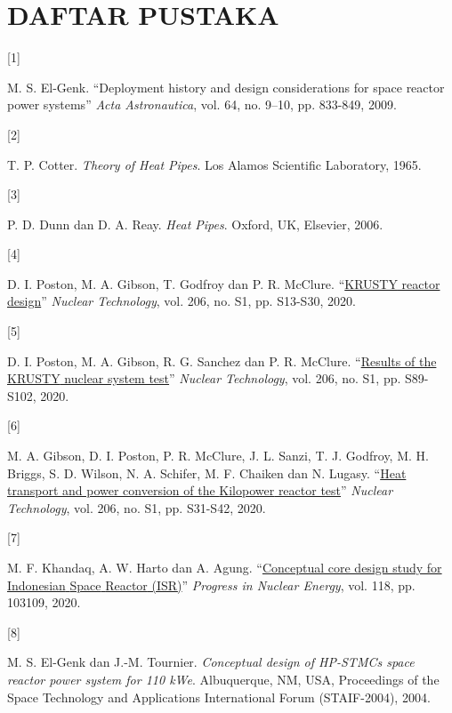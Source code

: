\documentclass[
  indonesian,
  12pt,
  a4paper,
]{report}
\newlength{\cslhangindent}
\newlength{\csllabelwidth}
\newenvironment{CSLReferences}[2] %
 {\begin{list}{}{%
  \setlength{\itemindent}{0pt}
  \setlength{\leftmargin}{0pt}
  \setlength{\parsep}{0pt}
  \ifodd #1
   \setlength{\leftmargin}{\cslhangindent}
   \setlength{\itemindent}{-1\cslhangindent}
  \fi
  \setlength{\itemsep}{#2\baselineskip}}}
 {\end{list}}
\newcommand{\CSLLeftMargin}[1]{\parbox[t]{\csllabelwidth}{\strut#1\strut}}
\newcommand{\CSLRightInline}[1]{\parbox[t]{\linewidth - \csllabelwidth}{\strut#1\strut}}
\begin{document}
\chapter*{DAFTAR PUSTAKA}

\protect{}\label{refs}
\begin{CSLReferences}{0}{1}
\CSLLeftMargin{{[}1{]} }%
\CSLRightInline{M. S. El-Genk. {``Deployment history and design
considerations for space reactor power systems''} \emph{Acta
Astronautica}, vol. 64, no. 9--10, pp. 833-849, 2009.}

\CSLLeftMargin{{[}2{]} }%
\CSLRightInline{T. P. Cotter. \emph{Theory of Heat Pipes}. Los Alamos
Scientific Laboratory, 1965.}

\CSLLeftMargin{{[}3{]} }%
\CSLRightInline{P. D. Dunn dan D. A. Reay. \emph{Heat Pipes}. Oxford,
UK, Elsevier, 2006.}

\CSLLeftMargin{{[}4{]} }%
\CSLRightInline{D. I. Poston, M. A. Gibson, T. Godfroy dan P. R.
McClure.
{``\href{https://doi.org/10.1080/00295450.2020.1725382}{{KRUSTY} reactor
design}''} \emph{Nuclear Technology}, vol. 206, no. S1, pp. S13-S30,
2020.}

\CSLLeftMargin{{[}5{]} }%
\CSLRightInline{D. I. Poston, M. A. Gibson, R. G. Sanchez dan P. R.
McClure. {``\href{https://doi.org/10.1080/00295450.2020.1730673}{Results
of the {KRUSTY} nuclear system test}''} \emph{Nuclear Technology}, vol.
206, no. S1, pp. S89-S102, 2020.}

\CSLLeftMargin{{[}6{]} }%
\CSLRightInline{M. A. Gibson, D. I. Poston, P. R. McClure, J. L. Sanzi,
T. J. Godfroy, M. H. Briggs, S. D. Wilson, N. A. Schifer, M. F. Chaiken
dan N. Lugasy.
{``\href{https://doi.org/10.1080/00295450.2019.1709364}{Heat transport
and power conversion of the {Kilopower} reactor test}''} \emph{Nuclear
Technology}, vol. 206, no. S1, pp. S31-S42, 2020.}

\CSLLeftMargin{{[}7{]} }%
\CSLRightInline{M. F. Khandaq, A. W. Harto dan A. Agung.
{``\href{https://doi.org/10.1016/j.pnucene.2019.103109}{Conceptual core
design study for {Indonesian} {Space} {Reactor} ({ISR})}''}
\emph{Progress in Nuclear Energy}, vol. 118, pp. 103109, 2020.}

\CSLLeftMargin{{[}8{]} }%
\CSLRightInline{M. S. El-Genk dan J.-M. Tournier. \emph{Conceptual
design of {HP-STMCs} space reactor power system for 110 {kWe}}.
Albuquerque, NM, USA, Proceedings of the Space Technology and
Applications International Forum (STAIF-2004), 2004.}


\end{CSLReferences}
\end{document}
